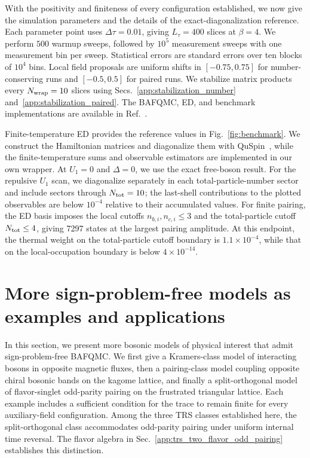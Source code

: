 With the positivity and finiteness of every configuration established, we now give the simulation parameters and the details of the exact-diagonalization reference. Each parameter point uses $\Delta\tau=0.01$, giving $L_\tau=400$ slices at $\beta=4$. We perform $500$ warmup sweeps, followed by $10^5$ measurement sweeps with one measurement bin per sweep. Statistical errors are standard errors over ten blocks of $10^4$ bins. Local field proposals are uniform shifts in $[-0.75,0.75]$ for number-conserving runs and $[-0.5,0.5]$ for paired runs. We stabilize matrix products every $N_{\rm wrap}=10$ slices using Secs.~\ref{app:stabilization_number} and~\ref{app:stabilization_paired}. The BAFQMC, ED, and benchmark implementations are available in Ref.~\cite{bafqmc_code}.

Finite-temperature ED provides the reference values in Fig.~\ref{fig:benchmark}. We construct the Hamiltonian matrices and diagonalize them with QuSpin~\cite{weinbergBukov2019quspin}, while the finite-temperature sums and observable estimators are implemented in our own wrapper. At $U_1=0$ and $\Delta=0$, we use the exact free-boson result. For the repulsive $U_1$ scan, we diagonalize separately in each total-particle-number sector and include sectors through $N_{\rm tot}=10$; the last-shell contributions to the plotted observables are below $10^{-4}$ relative to their accumulated values. For finite pairing, the ED basis imposes the local cutoffs $n_{b,i},n_{c,i}\le3$ and the total-particle cutoff $N_{\rm tot}\le4$, giving 7297 states at the largest pairing amplitude. At this endpoint, the thermal weight on the total-particle cutoff boundary is $1.1\times10^{-4}$, while that on the local-occupation boundary is below $4\times10^{-14}$.


\section{More sign-problem-free models as examples and applications}
\label{app:trs_models}

In this section, we present more bosonic models of physical interest that admit sign-problem-free BAFQMC. We first give a Kramers-class model of interacting bosons in opposite magnetic fluxes, then a pairing-class model coupling opposite chiral bosonic bands on the kagome lattice, and finally a split-orthogonal model of flavor-singlet odd-parity pairing on the frustrated triangular lattice. Each example includes a sufficient condition for the trace to remain finite for every auxiliary-field configuration. Among the three TRS classes established here, the split-orthogonal class accommodates odd-parity pairing under uniform internal time reversal. The flavor algebra in Sec.~\ref{app:trs_two_flavor_odd_pairing} establishes this distinction.

